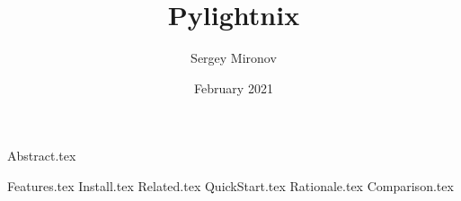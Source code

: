 \documentclass{article}
\begin{document}

\title{Pylightnix}
\author{Sergey Mironov}
\date{February 2021}
\maketitle

{Abstract.tex}

{Features.tex}
{Install.tex}
{Related.tex}
{QuickStart.tex}
{Rationale.tex}
{Comparison.tex}
\end{document}
